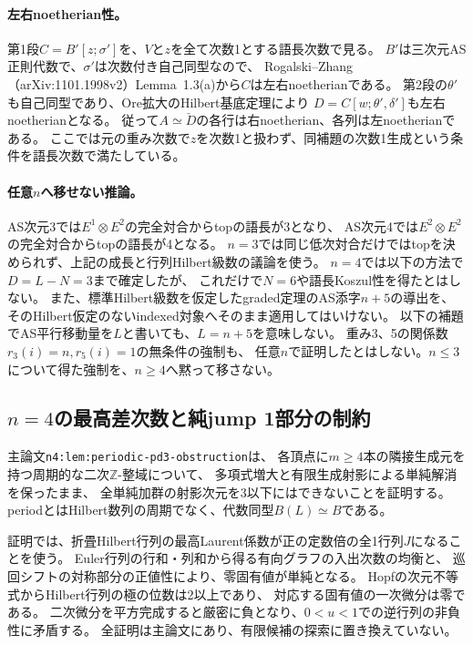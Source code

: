 \documentclass[11pt,a4paper]{ltjsarticle}
\begin{document}
\paragraph{左右noetherian性。}
第1段$C=B'[z;\sigma']$を、$V$と$z$を全て次数1とする語長次数で見る。
$B'$は三次元AS正則代数で、$\sigma'$は次数付き自己同型なので、
Rogalski--Zhang（arXiv:1101.1998v2）Lemma~1.3(a)から$C$は左右noetherianである。
第2段の$\theta'$も自己同型であり、Ore拡大のHilbert基底定理により
$D=C[w;\theta',\delta']$も左右noetherianとなる。
従って$A\simeq\check D$の各行は右noetherian、各列は左noetherianである。
ここでは元の重み次数で$z$を次数1と扱わず、同補題の次数1生成という条件を語長次数で満たしている。

\paragraph{任意$n$へ移せない推論。}
AS次元3では$E^1\otimes E^2$の完全対合からtopの語長が3となり、
AS次元4では$E^2\otimes E^2$の完全対合からtopの語長が4となる。
$n=3$では同じ低次対合だけではtopを決められず、上記の成長と行列Hilbert級数の議論を使う。
$n=4$では以下の方法で$D=L-N=3$まで確定したが、
これだけで$N=6$や語長Koszul性を得たとはしない。
また、標準Hilbert級数を仮定したgraded定理のAS添字$n+5$の導出を、
そのHilbert仮定のないindexed対象へそのまま適用してはいけない。
以下の補題でAS平行移動量を$L$と書いても、$L=n+5$を意味しない。
重み3、5の関係数$r_3(i)=n,r_5(i)=1$の無条件の強制も、
任意$n$で証明したとはしない。$n\leq3$について得た強制を、$n\geq4$へ黙って移さない。

\subsection{\texorpdfstring{$n=4$}{n=4}の最高差次数と純jump 1部分の制約}
\label{note:n4-current}
主論文\texttt{n4:lem:periodic-pd3-obstruction}は、
各頂点に$m\geq4$本の隣接生成元を持つ周期的な二次$\mathbb Z$-整域について、
多項式増大と有限生成射影による単純解消を保ったまま、
全単純加群の射影次元を3以下にはできないことを証明する。
periodとはHilbert数列の周期でなく、代数同型$B(L)\simeq B$である。

証明では、折畳Hilbert行列の最高Laurent係数が正の定数倍の全1行列$J$になることを使う。
Euler行列の行和・列和から得る有向グラフの入出次数の均衡と、
巡回シフトの対称部分の正値性により、零固有値が単純となる。
Hopfの次元不等式からHilbert行列の極の位数は2以上であり、
対応する固有値の一次微分は零である。
二次微分を平方完成すると厳密に負となり、$0<u<1$での逆行列の非負性に矛盾する。
全証明は主論文にあり、有限候補の探索に置き換えていない。
\end{document}
